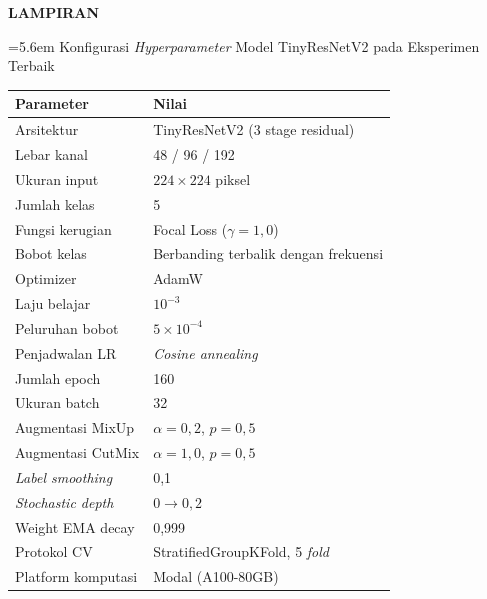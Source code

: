 
\clearpage
\vspace*{\fill}
\begin{center}
  {\fontsize{14pt}{17pt}\selectfont\bfseries LAMPIRAN}
\end{center}
\vspace*{\fill}

\clearpage

\label{lamp:hyperparameter}

\noindent\hangindent=5.6em
%
Konfigurasi \textit{Hyperparameter} Model TinyResNetV2 pada Eksperimen Terbaik

\vspace{4pt}

\centering
\begin{tabular}{l l}
  \toprule
  \textbf{Parameter} & \textbf{Nilai} \\
  \midrule
  Arsitektur          & TinyResNetV2 (3 stage residual) \\
  Lebar kanal         & 48 / 96 / 192 \\
  Ukuran input        & $224 \times 224$ piksel \\
  Jumlah kelas        & 5 \\
  Fungsi kerugian     & Focal Loss ($\gamma = 1{,}0$) \\
  Bobot kelas         & Berbanding terbalik dengan frekuensi \\
  Optimizer           & AdamW \\
  Laju belajar        & $10^{-3}$ \\
  Peluruhan bobot     & $5 \times 10^{-4}$ \\
  Penjadwalan LR      & \textit{Cosine annealing} \\
  Jumlah epoch        & 160 \\
  Ukuran batch        & 32 \\
  Augmentasi MixUp    & $\alpha = 0{,}2$, $p = 0{,}5$ \\
  Augmentasi CutMix   & $\alpha = 1{,}0$, $p = 0{,}5$ \\
  \textit{Label smoothing} & 0,1 \\
  \textit{Stochastic depth} & $0 \rightarrow 0{,}2$ \\
  Weight EMA decay    & 0,999 \\
  Protokol CV         & StratifiedGroupKFold, 5 \textit{fold} \\
  Platform komputasi  & Modal (A100-80GB) \\
  \bottomrule
\end{tabular}

